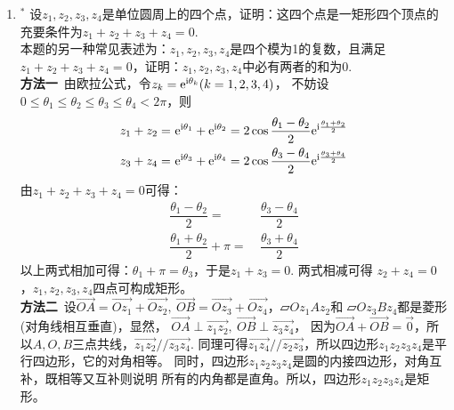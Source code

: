 \begin{enumerate}[label={【\textbf{例\thechapter.\arabic*}】},
 leftmargin=\inteval{\myenumleftmargin}pt,
 itemsep=\inteval{\myenumitempsep}pt,
 itemindent=\inteval{\myenumitemindent}pt]
\item $ ^* $ 
设$ z_1,z_2,z_3,z_4 $是单位圆周上的四个点，证明：这四个点是一矩形四个顶点的
充要条件为$ z_1+z_2+z_3+z_4=0 $. \\
本题的另一种常见表述为：$ z_1,z_2,z_3,z_4 $是四个模为1的复数，且满足
$ z_1+z_2+z_3+z_4=0 $，证明：$ z_1,z_2,z_3,z_4 $中必有两者的和为0.\\
\textbf{方法一}\ 由欧拉公式，令$ z_k=\mathrm{e}^{\mathrm{i}\theta_k} (k=1,2,3,4) $，
不妨设$ 0\leq \theta_1\leq \theta_2\leq \theta_3\leq \theta_4<2\pi $，则
\begin{align*}
    z_1+z_2=&\  \mathrm{e}^{\mathrm{i}\theta_1}+\mathrm{e}^{\mathrm{i}\theta_2}=
    2\cos\dfrac{\theta_1-\theta_2}{2}\mathrm{e}^{\mathrm{i}\frac{\theta_1+\theta_2}{2}} \\
    z_3+z_4=&\  \mathrm{e}^{\mathrm{i}\theta_3}+\mathrm{e}^{\mathrm{i}\theta_4}=2\cos\dfrac{\theta_3-
        \theta_4}{2} \mathrm{e}^{\mathrm{i}\frac{\theta_3+\theta_4}{2}}    
\end{align*}
由$ z_1+z_2+z_3+z_4=0 $可得：
\begin{align*}
    \dfrac{\theta_1-\theta_2}{2}=&\ \dfrac{\theta_3-\theta_4}{2} \\
    \dfrac{\theta_1+\theta_2}{2}+\pi=&\ \dfrac{\theta_3+\theta_4}{2}
\end{align*}
以上两式相加可得：$ \theta_1+\pi=\theta_3 $，于是$ z_1+z_3=0 $. 两式相减可得
$ z_2+z_4=0 $，$ z_1,z_2,z_3,z_4 $四点可构成矩形。\\
\textbf{方法二}\ 设$ \vec{OA}=\vec{Oz_1}+
\vec{Oz_2},\ \vec{OB}=\vec{Oz_3}+
\vec{Oz_4} $，$ \parallelogram Oz_1Az_2 $和
$ \parallelogram Oz_3Bz_4 $都是菱形(对角线相互垂直)，显然，
$ \vec{OA}\perp\vec{
    z_1z_2},\ \vec{OB}\perp\vec{z_3z_4} $，
因为$ \vec{OA}+\vec{OB}
=\vec{0} $，所以$ A,O,B $三点共线，$\vec{z_1z_2}
//\vec{z_3z_4} $. 同理可得$ \vec{z_1z_4}//
\vec{z_2z_3} $，所以四边形$ z_1z_2z_3z_4 $是平行四边形，它的对角相等。
同时，四边形$ z_1z_2z_3z_4 $是圆的内接四边形，对角互补，既相等又互补则说明
所有的内角都是直角。所以，四边形$ z_1z_2z_3z_4 $是矩形。


\end{enumerate}

